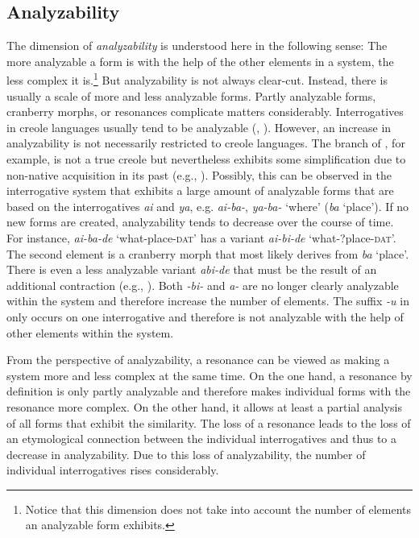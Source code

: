 \documentclass[output=paper,hidelinks]{langscibook}
\begin{document}
\subsection{Analyzability}
The dimension of \textit{analyzability} is understood here in the following sense: The more analyzable a form is with the help of the other elements in a system, the less complex it is.\footnote{Notice that this dimension does not take into account the number of elements an analyzable form exhibits.} But analyzability is not always clear-cut. Instead, there is usually a scale of more and less analyzable forms. Partly analyzable forms, cranberry morphs, or resonances complicate matters considerably. Interrogatives in creole languages usually tend to be analyzable (\citealt[65]{Bickerton2016}, \citealt[884]{MuyskenSmith1990}). However, an increase in analyzability is not necessarily restricted to creole languages. The  branch of , for example, is not a true creole but nevertheless exhibits some simplification due to non-native acquisition in its past (e.g., \citealt{McWhorter2007,Trudgill2011,Hölzl2018c}). Possibly, this can be observed in the interrogative system that exhibits a large amount of analyzable forms that are based on the interrogatives \textit{ai} and \textit{ya}, e.g.  \textit{ai-ba-}, \textit{ya-ba-} ‘where’ (\textit{ba} ‘place’). If no new forms are created, analyzability tends to decrease over the course of time. For instance,  \textit{ai-ba-de} `what-place-\textsc{dat}' has a variant \textit{ai-bi-de} `what-?place-\textsc{dat}'. The second element is a cranberry morph that most likely derives from \textit{ba} `place'. There is even a less analyzable variant \textit{abi-de} that must be the result of an additional contraction (e.g., \citealt{Norman2013}). Both \textit{-bi-} and \textit{a-} are no longer clearly analyzable within the system and therefore increase the number of elements. The suffix \textit{-u} in  only occurs on one interrogative and therefore is not analyzable with the help of other elements within the system.

From the perspective of analyzability, a resonance can be viewed as making a system more and less complex at the same time. On the one hand, a resonance by definition is only partly analyzable and therefore makes individual forms with the resonance more complex. On the other hand, it allows at least a partial analysis of all forms that exhibit the similarity. The loss of a resonance leads to the loss of an etymological connection between the individual interrogatives and thus to a decrease in analyzability. Due to this loss of analyzability, the number of individual interrogatives rises considerably.
\end{document}
